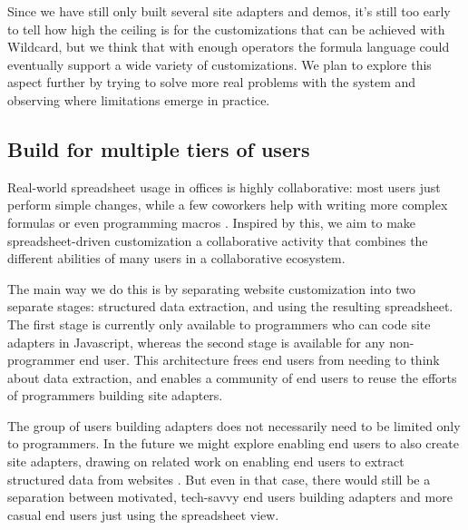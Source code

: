 \documentclass[english,submission]{programming}
\begin{document}
Since we have still only built several site adapters and demos, it's
still too early to tell how high the ceiling is for the customizations
that can be achieved with Wildcard, but we think that with enough
operators the formula language could eventually support a wide variety
of customizations. We plan to explore this aspect further by trying to
solve more real problems with the system and observing where limitations
emerge in practice.

\hypertarget{build-for-multiple-tiers-of-users}{%
\subsection{Build for multiple tiers of
users}\label{build-for-multiple-tiers-of-users}}

Real-world spreadsheet usage in offices is highly collaborative: most
users just perform simple changes, while a few coworkers help with
writing more complex formulas or even programming macros
\autocite{nardi1990}. Inspired by this, we aim to make
spreadsheet-driven customization a collaborative activity that combines
the different abilities of many users in a collaborative ecosystem.

The main way we do this is by separating website customization into two
separate stages: structured data extraction, and using the resulting
spreadsheet. The first stage is currently only available to programmers
who can code site adapters in Javascript, whereas the second stage is
available for any non-programmer end user. This architecture frees end
users from needing to think about data extraction, and enables a
community of end users to reuse the efforts of programmers building site
adapters.

The group of users building adapters does not necessarily need to be
limited only to programmers. In the future we might explore enabling end
users to also create site adapters, drawing on related work on enabling
end users to extract structured data from websites
\autocite{chasins2018,huynh2006}. But even in that case, there would
still be a separation between motivated, tech-savvy end users building
adapters and more casual end users just using the spreadsheet view.
\end{document}
